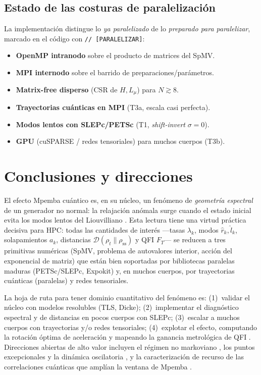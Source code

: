 \documentclass[11pt,a4paper]{article}
\theoremstyle{definition}
\theoremstyle{plain}
\newcommand{\Dop}{\mathcal{D}}
\newcommand{\rss}{\rho_{\mathrm{ss}}}
\begin{document}
\subsection{Estado de las costuras de paralelización}

La implementación distingue lo \emph{ya paralelizado} de lo \emph{preparado para
paralelizar}, marcado en el código con \texttt{// [PARALELIZAR]}:

\begin{itemize}[leftmargin=1.6em,itemsep=2pt]
\item[\checkmark] \textbf{OpenMP intranodo} sobre el producto de matrices del SpMV.
\item[\checkmark] \textbf{MPI internodo} sobre el barrido de preparaciones/parámetros.
\item[$\circ$] \textbf{Matrix-free disperso} (CSR de $H,L_\mu$) para $N\gtrsim8$.
\item[$\circ$] \textbf{Trayectorias cuánticas en MPI} (T3a, escala casi perfecta).
\item[$\circ$] \textbf{Modos lentos con SLEPc/PETSc} (T1, \emph{shift-invert} $\sigma{=}0$).
\item[$\circ$] \textbf{GPU} (cuSPARSE / redes tensoriales) para muchos cuerpos (T3b).
\end{itemize}

\section{Conclusiones y direcciones}

El efecto Mpemba cuántico es, en su núcleo, un fenómeno de \emph{geometría espectral} de un generador no
normal: la relajación anómala surge cuando el estado inicial evita los modos lentos del Liouvilliano
\cite{Carollo2021,LiYang2026,AresCalabreseMurciano2025}. Esta lectura tiene una virtud práctica decisiva
para HPC: todas las cantidades de interés —tasas $\lambda_k$, modos $\hat r_k,\hat l_k$, solapamientos
$a_k$, distancias $\Dop(\rho_t\|\rss)$ y QFI $F_T$— se reducen a tres primitivas numéricas (SpMV, problema de
autovalores interior, acción del exponencial de matriz) que están bien soportadas por bibliotecas paralelas
maduras (PETSc/SLEPc, Expokit) y, en muchos cuerpos, por trayectorias cuánticas (paralelas) y redes
tensoriales.

La hoja de ruta para tener dominio cuantitativo del fenómeno es: (1)~validar el núcleo con modelos resolubles
(TLS, Dicke); (2)~implementar el diagnóstico espectral y de distancias en pocos cuerpos con SLEPc;
(3)~escalar a muchos cuerpos con trayectorias y/o redes tensoriales; (4)~explotar el efecto, computando la
rotación óptima de aceleración \cite{Carollo2021,Kochsiek2022} y mapeando la ganancia metrológica de QFI
\cite{Chattopadhyay2026,LiYang2026}. Direcciones abiertas de alto valor incluyen el régimen no markoviano
\cite{Strachan2025}, los puntos excepcionales y la dinámica oscilatoria \cite{Chatterjee2024}, y la
caracterización de recurso de las correlaciones cuánticas que amplían la ventana de Mpemba
\cite{Alyuruk2025,Summer2026}.
\end{document}
